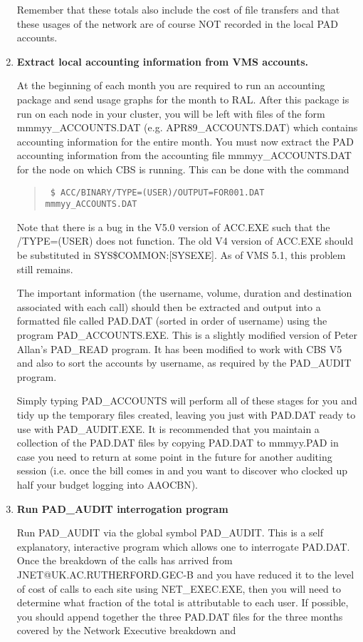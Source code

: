 \begin{enumerate}
Remember that these totals also include the cost of file transfers and that
these usages of the network are of course NOT recorded in the local PAD
accounts. 


\item {\bf Extract local accounting information from VMS accounts.}

At the beginning of each month you are required to run an accounting
package and send usage graphs for the month to RAL. After this package is
run on each node in your cluster, you will be left with files of the form
mmmyy\_\/ACCOUNTS.DAT (e.g. APR89\_\/ACCOUNTS.DAT) which contains accounting
information for the entire month. You must now extract the PAD accounting
information from the accounting file mmmyy\_\/ACCOUNTS.DAT for the node on
which CBS is running. This can be done with the command 

\begin{quote} \tt
\$ ACC/BINARY/TYPE=(USER)/OUTPUT=FOR001.DAT mmmyy\_\/ACCOUNTS.DAT 
\end{quote}

Note that there is a bug in the V5.0 version of ACC.EXE such that the
/TYPE=(USER) does not function. The old V4 version of ACC.EXE should be
substituted in SYS\$COMMON:[SYSEXE]. As of VMS 5.1, this problem still
remains. 

The important information (the username, volume, duration and destination
associated with each call) should then be extracted and output into a
formatted file called PAD.DAT (sorted in order of username) using the
program PAD\_\/ACCOUNTS.EXE. This is a slightly modified version of Peter
Allan's PAD\_\/READ program. It has been modified to work with CBS V5 and also
to sort the accounts by username, as required by the PAD\_\/AUDIT program. 

Simply typing PAD\_\/ACCOUNTS will perform all of these stages 
for you and tidy up the temporary files created, leaving you just with
PAD.DAT ready to use with PAD\_\/AUDIT.EXE. It is recommended that you maintain
a collection of the PAD.DAT files by copying PAD.DAT to mmmyy.PAD in case
you need to return at some point in the future for another auditing session
(i.e. once the bill comes in and you want to discover who clocked up half
your budget logging into AAOCBN). 

\item {\bf Run PAD\_\/AUDIT interrogation program}

Run PAD\_\/AUDIT via the global symbol PAD\_\/AUDIT. This is a self explanatory,
interactive program which allows one to interrogate PAD.DAT. Once the breakdown
of the calls has arrived from JNET@UK.AC.RUTHERFORD.GEC-B and you have reduced
it to the level of cost of calls to each site using NET\_\/EXEC.EXE, then you 
will need to determine what fraction of the total is attributable to each user.
If possible, you should append together the three PAD.DAT files for the three
months covered by the Network Executive breakdown and 


\end{enumerate}
